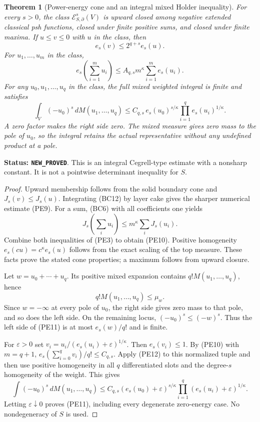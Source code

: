 \documentclass[11pt,a4paper]{article}
\numberwithin{equation}{section}
\newtheorem{theorem}{Theorem}[section]
\theoremstyle{definition}
\theoremstyle{remark}
\begin{document}
\begin{theorem}[Power-energy cone and an integral mixed Holder inequality]
\label{thm:r11-power-mixed-holder}
For every $s>0$, the class $\mathcal E^s_{S,\partial}(V)$ is
upward closed among negative extended classical psh functions,
closed under finite positive sums, and closed under finite maxima.
If $u\leq v\leq0$ with $u$ in the class, then
\[
                         e_s(v)\leq2^{q+s}e_s(u).
 \tag{PE9}
\]
For $u_1,\ldots,u_m$ in the class,
\[
                  e_s\left(\sum_{i=1}^m u_i\right)
                    \leq A_{q,s}m^\kappa\sum_{i=1}^m e_s(u_i).
 \tag{PE10}
\]
For any $u_0,u_1,\ldots,u_q$ in the class, the full mixed
weighted integral is finite and satisfies
\[
 \boxed{\quad
 \int_V(-u_0)^s\,dM(u_1,\ldots,u_q)
 \leq C_{q,s}\,e_s(u_0)^{s/\kappa}
                         \prod_{i=1}^q e_s(u_i)^{1/\kappa}.
 \quad}
 \tag{PE11}
\]
A zero factor makes the right side zero. The mixed measure gives
zero mass to the pole of $u_0$, so the integral retains the
actual representative without any undefined product at a pole.
\end{theorem}

\noindent\textbf{Status: \texttt{NEW\_PROVED}}. This is an
integral Cegrell-type estimate with a nonsharp constant. It is
not a pointwise determinant inequality for $S$.

\begin{proof}
Upward membership follows from the solid boundary cone and
$J_s(v)\leq J_s(u)$. Integrating (BC12) by layer cake gives
the sharper numerical estimate (PE9). For a sum, (BC6) with
all coefficients one yields
\[
 J_s\left(\sum_i u_i\right)\leq m^\kappa\sum_iJ_s(u_i).
\]
Combine both inequalities of (PE3) to obtain (PE10).
Positive homogeneity $e_s(cu)=c^\kappa e_s(u)$ follows from
the exact scaling of the top measure. These facts prove the
stated cone properties; a maximum follows from upward closure.

Let $w=u_0+\cdots+u_q$. Its positive mixed expansion contains
$q!M(u_1,\ldots,u_q)$, hence
\[
                 q!M(u_1,\ldots,u_q)\leq\mu_w.
 \tag{PE12}
\]
Since $w=-\infty$ at every pole of $u_0$, the right side gives
zero mass to that pole, and so does the left side. On the
remaining locus, $(-u_0)^s\leq(-w)^s$. Thus the left side
of (PE11) is at most $e_s(w)/q!$ and is finite.

For $\varepsilon>0$ set
$v_i=u_i/(e_s(u_i)+\varepsilon)^{1/\kappa}$.
Then $e_s(v_i)\leq1$. By (PE10) with $m=q+1$,
$e_s(\sum_{i=0}^qv_i)/q!\leq C_{q,s}$.
Apply (PE12) to this normalized tuple and then use positive
homogeneity in all $q$ differentiated slots and the degree-$s$
homogeneity of the weight. This gives
\[
 \int(-u_0)^s\,dM(u_1,\ldots,u_q)
 \leq C_{q,s}(e_s(u_0)+\varepsilon)^{s/\kappa}
                       \prod_{i=1}^q(e_s(u_i)+\varepsilon)^{1/\kappa}.
\]
Letting $\varepsilon\downarrow0$ proves (PE11), including every
degenerate zero-energy case. No nondegeneracy of $S$ is used.
\end{proof}
\end{document}
